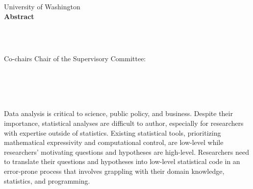 
\thispagestyle{empty}
\begin{centering}
\vspace{1in}
University of Washington \\
\vspace*{1.\baselineskip}
{\bf Abstract}\\
\vspace*{1\baselineskip}

{\thesisTitle}\\ %
\vspace*{1.\baselineskip}
{\authorName} \\ %
\vspace*{1.\baselineskip}


\ifdefined\secondAdvisor
    Co-chairs
    \else
    Chair
\fi
of the Supervisory Committee:\\ %
\advisorTitle~\advisor\\ \vspace{-.5em} \advisorDepartment \\
\ifdefined\secondAdvisor
    \secondAdvisorTitle~\secondAdvisor\\\vspace{-.5em}\secondAdvisorDepartment \\
\fi
\end{centering}
\vspace*{\baselineskip}

Data analysis is critical to science, public policy, and business. Despite their
importance, statistical analyses are difficult to author, especially for
researchers with expertise outside of statistics. Existing statistical tools,
prioritizing mathematical expressivity and computational control, are low-level
while researchers’ motivating questions and hypotheses are high-level.
Researchers need to translate their questions and hypotheses into low-level
statistical code in an error-prone process that involves grappling with their
domain knowledge, statistics, and programming. 

